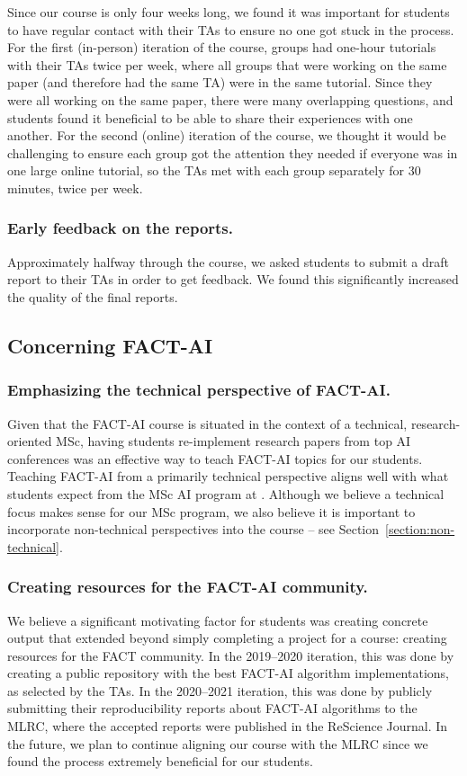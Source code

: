 Since our course is only four weeks long, we found it was important for students to have regular contact with their TAs to ensure no one got stuck in the process. 
For the first (in-person) iteration of the course, groups had one-hour tutorials with their TAs twice per week, where all groups that were working on the same paper (and therefore had the same TA) were in the same tutorial. 
Since they were all working on the same paper, there were many overlapping questions, and students found it beneficial to be able to share their experiences with one another. 
For the second (online) iteration of the course, we thought it would be challenging to ensure each group got the attention they needed if everyone was in one large online tutorial, so the TAs met with each group separately for 30 minutes, twice per week. 

\subsubsection{Early feedback on the reports.}
Approximately halfway through the course, we asked students to submit a draft report to their TAs in order to get feedback. We found this significantly increased the quality of the final reports. 

\subsection{Concerning FACT-AI}

\subsubsection{Emphasizing the technical perspective of FACT-AI.}
Given that the FACT-AI course is situated in the context of a technical, research-oriented MSc, having students re-implement research papers from top AI conferences was an effective way to teach FACT-AI topics for our students. 
Teaching FACT-AI from a primarily technical perspective 
aligns well with what students expect from the MSc AI program at \OurUniversity{}.
Although we believe a technical focus makes sense for our MSc program, we also believe it is important to incorporate non-technical perspectives into the course -- see Section~\ref{section:non-technical}. 

\subsubsection{Creating resources for the FACT-AI community.}
We believe a significant motivating factor for students was creating concrete output that extended beyond simply completing a project for a course: creating resources for the FACT community. 
In the 2019--2020 iteration, this was done by creating a public repository with the best FACT-AI algorithm implementations, as selected by the TAs. 
In the 2020--2021 iteration, this was done by publicly submitting their reproducibility reports about FACT-AI algorithms to the MLRC, where the accepted reports were published in the ReScience Journal. 
In the future, we plan to continue aligning our course with the MLRC since we found the process extremely beneficial for our students. 

